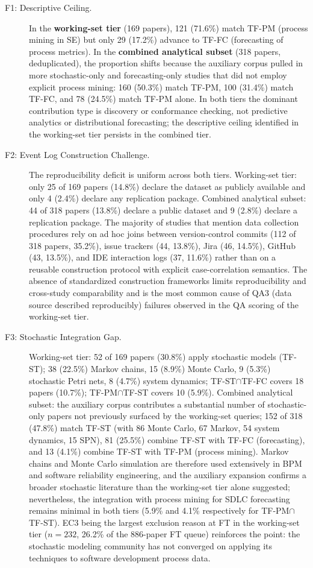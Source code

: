 \begin{description}

\item[F1: Descriptive Ceiling.]
In the \textbf{working-set tier} (169 papers), 121 (71.6\%) match TF-PM
(process mining in SE) but only 29 (17.2\%) advance to TF-FC (forecasting
of process metrics). In the \textbf{combined analytical subset} (318 papers,
deduplicated), the proportion shifts because the auxiliary corpus pulled in
more stochastic-only and forecasting-only studies that did not employ
explicit process mining: 160 (50.3\%) match TF-PM, 100 (31.4\%) match TF-FC,
and 78 (24.5\%) match TF-PM alone. In both tiers the dominant contribution
type is discovery or conformance checking, not predictive analytics or
distributional forecasting; the descriptive ceiling identified in the
working-set tier persists in the combined tier.

\item[F2: Event Log Construction Challenge.]
The reproducibility deficit is uniform across both tiers. Working-set tier:
only 25 of 169 papers (14.8\%) declare the dataset as publicly available
and only 4 (2.4\%) declare any replication package. Combined analytical
subset: 44 of 318 papers (13.8\%) declare a public dataset and 9 (2.8\%)
declare a replication package. The majority of studies that mention data
collection procedures rely on ad hoc joins between version-control commits
(112 of 318 papers, 35.2\%), issue trackers (44, 13.8\%), Jira (46, 14.5\%),
GitHub (43, 13.5\%), and IDE interaction logs (37, 11.6\%) rather than on a
reusable construction protocol with explicit case-correlation semantics. The absence of standardized construction
frameworks limits reproducibility and cross-study comparability and is the
most common cause of QA3 (data source described reproducibly) failures
observed in the QA scoring of the working-set tier.

\item[F3: Stochastic Integration Gap.]
Working-set tier: 52 of 169 papers (30.8\%) apply stochastic models
(TF-ST); 38 (22.5\%) Markov chains, 15 (8.9\%) Monte Carlo, 9 (5.3\%)
stochastic Petri nets, 8 (4.7\%) system dynamics; TF-ST$\cap$TF-FC covers 18
papers (10.7\%); TF-PM$\cap$TF-ST covers 10 (5.9\%). Combined analytical
subset: the
auxiliary corpus contributes a substantial number of stochastic-only papers
not previously surfaced by the working-set queries; 152 of 318 (47.8\%)
match TF-ST (with 86 Monte Carlo, 67 Markov, 54 system dynamics, 15 SPN), 81
(25.5\%) combine TF-ST with TF-FC (forecasting), and 13 (4.1\%) combine TF-ST
with TF-PM (process mining). Markov chains and Monte Carlo simulation are
therefore used extensively in BPM and software reliability engineering, and
the auxiliary expansion confirms a broader stochastic literature than the
working-set tier alone suggested; nevertheless, the integration with process
mining for SDLC forecasting remains minimal in both tiers (5.9\% and 4.1\%
respectively for TF-PM$\cap$TF-ST). EC3 being the largest exclusion reason at
FT in the working-set tier ($n=232$, 26.2\% of the 886-paper FT queue)
reinforces the point: the stochastic modeling community has not converged
on applying its techniques to software development process data.


\end{description}
